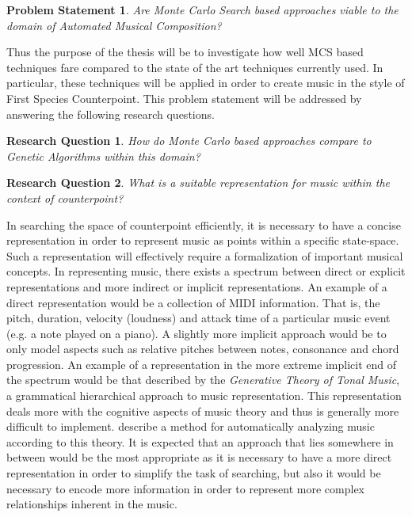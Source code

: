 \documentclass[master.tex]{subfiles} %
\newtheorem*{ps}{Problem Statement}
\newtheorem{researchquestion}{Research Question}
\begin{document}
\begin{ps}
Are Monte Carlo Search based approaches viable to the domain of Automated Musical Composition?
\end{ps}
Thus the purpose of the thesis will be to investigate how well MCS based techniques fare compared to the state of the art techniques currently used. In particular, these techniques will be applied in order to create music in the style of First Species Counterpoint. This problem statement will be addressed by answering the following research questions. 

\begin{researchquestion}
How do Monte Carlo based approaches compare to Genetic Algorithms within this domain? 
\end{researchquestion}



\begin{researchquestion}
What is a suitable representation for music within the context of counterpoint?
\end{researchquestion} 

In searching the space of counterpoint efficiently, it is necessary to have a concise representation in order to represent music as points within a specific state-space. Such a representation will effectively require a formalization of important musical concepts. In representing music, there exists a spectrum between direct  or explicit representations and more indirect or implicit representations. An example of a direct representation would be a collection of MIDI information. That is, the pitch, duration, velocity (loudness) and attack time of a particular music event (e.g. a note played on a piano). A slightly more implicit approach would be to only model aspects such as relative pitches between notes, consonance and chord progression. An example of a representation in the more extreme implicit end of the spectrum would be that described by the \emph{Generative Theory of Tonal Music}, a grammatical hierarchical approach to music representation. This representation deals more with the cognitive aspects of music theory and thus is generally more difficult to implement.  describe a method for automatically analyzing music according to this theory. It is expected that an approach that lies somewhere in between would be the most appropriate as it is necessary to have a more direct representation in order to simplify the task of searching, but also it would be necessary to encode more information in order to represent more complex relationships inherent in the music. 
\end{document}
